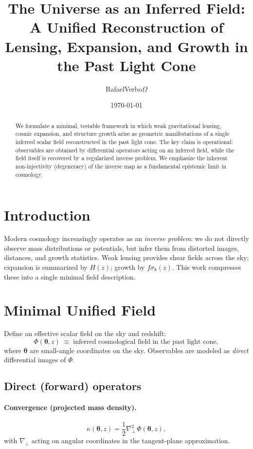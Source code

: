 \documentclass[11pt]{article}
\title{\textbf{The Universe as an Inferred Field:}\\
A Unified Reconstruction of Lensing, Expansion, and Growth in the Past Light Cone}
\author{RafaelVerbo$\Omega$}
\date{\today}
\begin{document}
\maketitle

\begin{abstract}
We formulate a minimal, testable framework in which weak gravitational lensing, cosmic expansion, and structure growth arise as geometric manifestations of a single inferred scalar field reconstructed in the past light cone. The key claim is operational: observables are obtained by differential operators acting on an inferred field, while the field itself is recovered by a regularized inverse problem. We emphasize the inherent non-injectivity (degeneracy) of the inverse map as a fundamental epistemic limit in cosmology.
\end{abstract}

\section{Introduction}
Modern cosmology increasingly operates as an \emph{inverse problem}: we do not directly observe mass distributions or potentials, but infer them from distorted images, distances, and growth statistics. Weak lensing provides shear fields across the sky; expansion is summarized by $H(z)$; growth by $f\sigma_8(z)$. This work compresses these into a single minimal field description.

\section{Minimal Unified Field}
Define an effective scalar field on the sky and redshift:
\begin{equation}
\Phi(\bm{\theta}, z)\;\equiv\;\text{inferred cosmological field in the past light cone},
\end{equation}
where $\bm{\theta}$ are small-angle coordinates on the sky. Observables are modeled as \emph{direct} differential images of $\Phi$.

\subsection{Direct (forward) operators}
\paragraph{Convergence (projected mass density).}
\begin{equation}
\kappa(\bm{\theta}, z)=\frac12\nabla_\perp^2\,\Phi(\bm{\theta}, z),
\end{equation}
with $\nabla_\perp$ acting on angular coordinates in the tangent-plane approximation.
\end{document}
